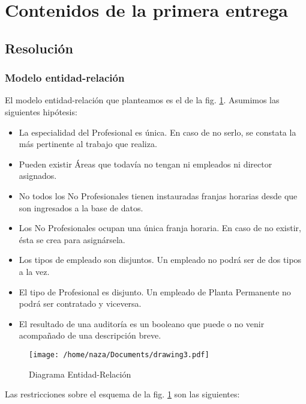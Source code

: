 \section{Contenidos de la primera entrega}
\subsection{Resolución}
\subsubsection{Modelo entidad-relación}

El modelo entidad-relación que planteamos es el de la fig. \ref{fig:der}.
Asumimos las siguientes hipótesis:

\begin{itemize}
    \item La especialidad del Profesional es única. En caso de no serlo, se constata la
          más pertinente al trabajo que realiza.
    \item Pueden existir Áreas que todavía no tengan ni empleados ni director asignados.
    \item No todos los No Profesionales tienen instauradas franjas horarias desde que son
          ingresados a la base de datos.
    \item Los No Profesionales ocupan una única franja horaria. En caso de no existir,
          ésta se crea para asignársela.
    \item Los tipos de empleado son disjuntos. Un empleado no podrá ser de dos tipos a la
          vez.
    \item El tipo de Profesional es disjunto. Un empleado de Planta Permanente no podrá
          ser contratado y viceversa.
    \item El resultado de una auditoría es un booleano que puede o no venir acompañado de
          una descripción breve.
\end{itemize}

\begin{landscape}
    \begin{figure}[h]
        \centering
        \texttt{[image: /home/naza/Documents/drawing3.pdf]}
        \caption{Diagrama Entidad-Relación}
        \label{fig:der}
    \end{figure}
\end{landscape}

Las restricciones sobre el esquema de la fig. \ref{fig:der} son las siguientes:

